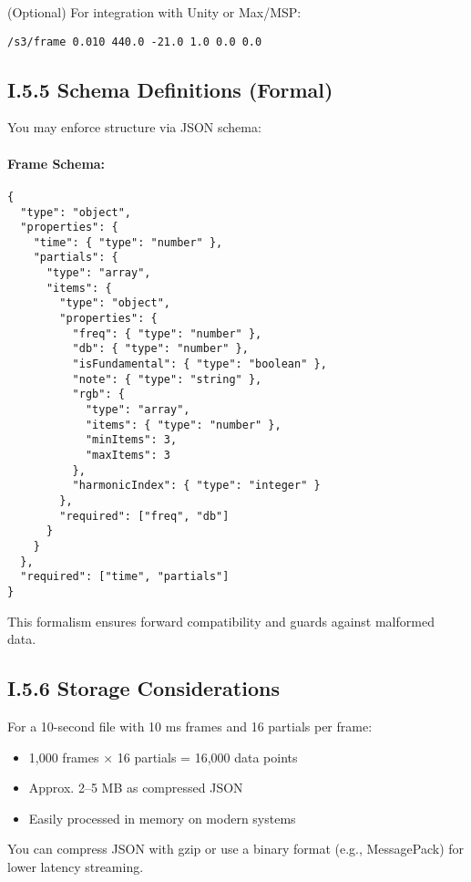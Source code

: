 (Optional) For integration with Unity or Max/MSP:

\begin{verbatim}
/s3/frame 0.010 440.0 -21.0 1.0 0.0 0.0
\end{verbatim}

\subsection*{I.5.5 Schema Definitions (Formal)}

You may enforce structure via JSON schema:

\paragraph{Frame Schema:}

\begin{verbatim}
{
  "type": "object",
  "properties": {
    "time": { "type": "number" },
    "partials": {
      "type": "array",
      "items": {
        "type": "object",
        "properties": {
          "freq": { "type": "number" },
          "db": { "type": "number" },
          "isFundamental": { "type": "boolean" },
          "note": { "type": "string" },
          "rgb": {
            "type": "array",
            "items": { "type": "number" },
            "minItems": 3,
            "maxItems": 3
          },
          "harmonicIndex": { "type": "integer" }
        },
        "required": ["freq", "db"]
      }
    }
  },
  "required": ["time", "partials"]
}
\end{verbatim}

This formalism ensures forward compatibility and guards against malformed data.

\subsection*{I.5.6 Storage Considerations}

For a 10-second file with 10 ms frames and 16 partials per frame:

\begin{itemize}
    \item 1,000 frames × 16 partials = 16,000 data points
    \item Approx. 2–5 MB as compressed JSON
    \item Easily processed in memory on modern systems
\end{itemize}

You can compress JSON with gzip or use a binary format (e.g., MessagePack) for lower latency streaming.

